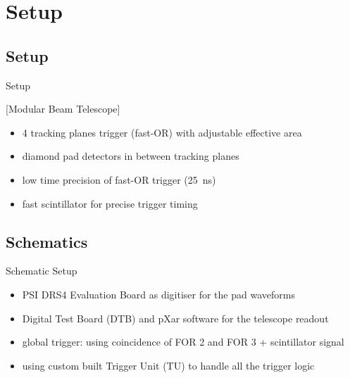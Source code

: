 \section{Setup}
\subsection{Setup}
\begin{frame}{Setup}

	[Modular Beam Telescope]\vspace{-10pt}

	\begin{itemize}\itemfill
		\item 4 tracking planes \ra trigger (fast-OR) with adjustable effective area
		\item diamond pad detectors in between tracking planes
		\item low time precision of fast-OR trigger (\SI{25}{\nano\second})
		\item fast scintillator for precise trigger timing \ra {}
	\end{itemize}

\end{frame}
\subsection{Schematics}
\begin{frame}{Schematic Setup}
 
	\vspace*{-20pt}\vspace*{-10pt}
 
	\begin{itemize}\itemfill
		\item PSI DRS4 Evaluation Board as digitiser for the pad waveforms
		\item Digital Test Board (DTB) and pXar software for the telescope readout
		\item global trigger: using coincidence of FOR 2 and FOR 3 + scintillator signal
		\item using custom built Trigger Unit (TU) to handle all the trigger logic
	\end{itemize}

\end{frame}
